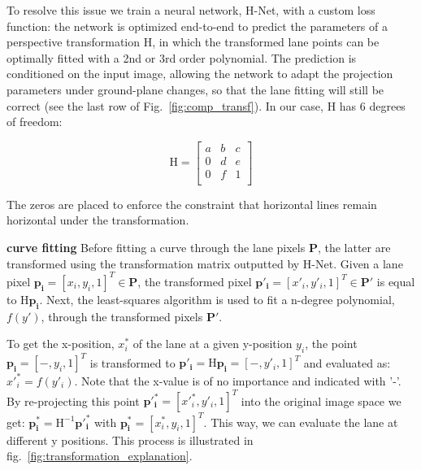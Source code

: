 \documentclass[letterpaper, 10 pt, conference]{ieeeconf}
\begin{document}
To resolve this issue we train a neural network, H-Net, with a custom loss function: the network is optimized end-to-end to predict the parameters of a perspective transformation H, in which the transformed lane points can be optimally fitted with a 2nd or 3rd order polynomial. The prediction is conditioned on the input image, allowing the network to adapt the projection parameters under ground-plane changes, so that the lane fitting will still be correct (see the last row of Fig.~\ref{fig:comp_transf}). In our case, H has 6 degrees of freedom: 

$$
\mathrm{H}=
\begin{bmatrix}
a & b & c \\
0 & d & e \\
0 & f & 1 \\
\end{bmatrix}
$$

The zeros are placed to enforce the constraint that horizontal lines remain horizontal under the transformation. 

\textbf{curve fitting} Before fitting a curve through the lane pixels $\mathbf{P}$, the latter are transformed using the transformation matrix outputted by H-Net. Given a lane pixel $\mathbf{p_i} = [x_i,y_i,1]^T \in \mathbf{P}$, the transformed pixel $\mathbf{p'_i} = [x'_i,y'_i,1]^T \in \mathbf{P'}$ is equal to $\mathrm{H}\mathbf{p_i}$. Next, the least-squares algorithm is used to fit a n-degree polynomial, $f(y')$, through the transformed pixels $\mathbf{P'}$. 

To get the x-position, $x^*_i$ of the lane at a given y-position $y_i$, the point $\mathbf{p_i}=[-,y_i,1]^T$ is transformed to $\mathbf{p'_i}=\mathrm{H}\mathbf{p_i}=[-,y'_i,1]^T$ and evaluated as: $x'^*_i=f(y'_i)$. Note that the x-value is of no importance and indicated with '-'. By re-projecting this point $\mathbf{p'^*_i}=[x'^*_i,y'_i,1]^T$ into the original image space we get:  $\mathbf{p^*_i}=\mathrm{H^{-1}}\mathbf{p'^*_i}$ with $\mathbf{p^*_i}=[x^*_i,y_i,1]^T$.
This way, we can evaluate the lane at different y positions. This process is illustrated in fig.~\ref{fig:transformation_explanation}.
\end{document}
